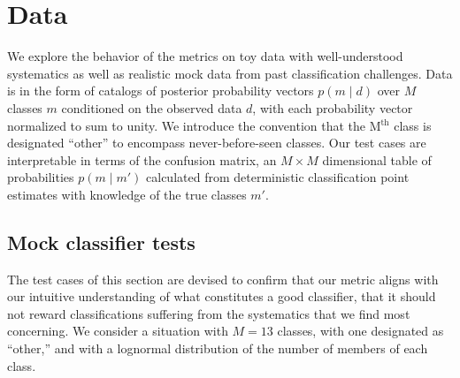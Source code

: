 \section{Data}
\label{sec:data}

We explore the behavior of the metrics on toy data with well-understood systematics as well as realistic mock data from past classification challenges.
Data is in the form of catalogs of posterior probability vectors $p(m \mid d)$ over $M$ classes $m$ conditioned on the observed data $d$, with each probability vector normalized to sum to unity.
We introduce the convention that the M$^{\mathrm{th}}$ class is designated ``other'' to encompass never-before-seen classes.
Our test cases are interpretable in terms of the confusion matrix, an $M\times M$ dimensional table of probabilities $p(m \mid m')$ calculated from deterministic classification point estimates with knowledge of the true classes $m'$.
\subsection{Mock classifier tests}
\label{sec:mockdata}

The test cases of this section are devised to confirm that our metric aligns with our intuitive understanding of what constitutes a good classifier, that it should not reward classifications suffering from the systematics that we find most concerning.
We consider a situation with $M=13$ classes, with one designated as ``other,'' and with a lognormal distribution of the number of members of each class.


